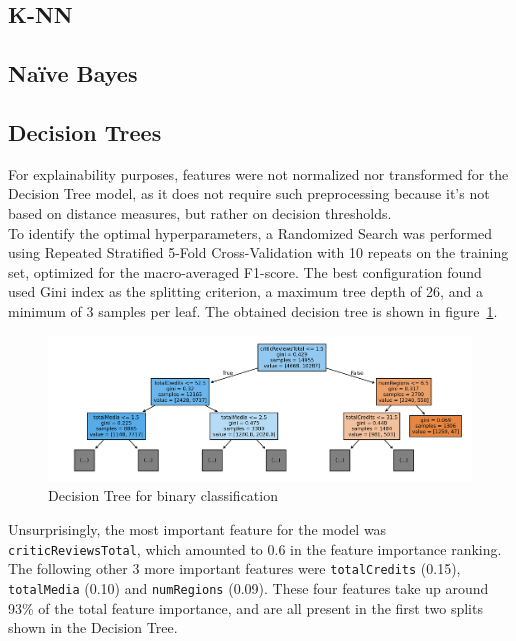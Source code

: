 \subsection{K-NN}


\subsection{Naïve Bayes}


\subsection{Decision Trees}
For explainability purposes, features were not normalized nor transformed for the Decision Tree model,
as it does not require such preprocessing because it's not based on distance measures, but rather on
decision thresholds.\\

To identify the optimal hyperparameters, a Randomized Search was performed
using Repeated Stratified 5-Fold Cross-Validation with 10 repeats on the training set, optimized for
the macro-averaged F1-score.
The best configuration found used Gini index as the splitting criterion,
a maximum tree depth of 26, and a minimum of 3 samples per leaf.
The obtained decision tree is shown in figure~\ref{fig:binary_dt}.
\begin{figure}[H]
    \centering
    \includegraphics[width=0.8\linewidth]{plots/binary_dt.png}
    \captionsetup{justification=centering, width=0.9\linewidth}
    \caption{Decision Tree for binary classification}
    \label{fig:binary_dt}
\end{figure}

Unsurprisingly, the most important feature for the model was \texttt{criticReviewsTotal},
which amounted to 0.6 in the feature importance ranking. The following other 3 more important
features were \texttt{totalCredits} (0.15), \texttt{totalMedia} (0.10) and \texttt{numRegions} (0.09).
These four features take up around 93\% of the total feature importance, and are all present in the first
two splits shown in the Decision Tree.\\

